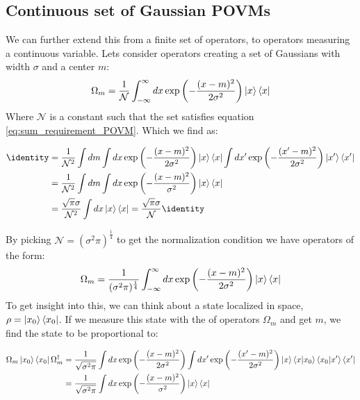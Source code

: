 \subsection{Continuous set of Gaussian POVMs}
We can further extend this from a finite set of operators, to operators measuring a continuous variable. Lets consider operators creating a set of Gaussians with width $\sigma$ and a center $m$:
\begin{equation}
    \Omega_m = \frac{1}{\mathcal{N}}\int_{-\infty}^\infty dx \exp\left(-\frac{(x- m)^2}{2\sigma^2}\right)\ket{x}\bra{x}
\end{equation}
Where $\mathcal{N}$ is a constant such that the set satisfies equation \ref{eq:sum_requirement_POVM}. Which we find as:
\begin{fullwidth}
\begin{align*}
    \identity &= \frac{1}{\mathcal{N}^2}\int dm \int dx \exp\left(-\frac{(x- m)^2}{2\sigma^2}\right)\ket{x}\bra{x}\int dx' \exp\left(-\frac{(x'- m)^2}{2\sigma^2}\right)\ket{x'}\bra{x'} \\
              &= \frac{1}{\mathcal{N}^2}\int dm \int dx \exp\left(-\frac{(x- m)^2}{\sigma^2}\right)\ket{x}\bra{x} \\
              &= \frac{\sqrt{\pi}\sigma }{\mathcal{N}^2} \int dx \ket{x}\bra{x} = \frac{\sqrt{\pi}\sigma }{\mathcal{N}} \identity 
\end{align*}
\end{fullwidth}
By picking $\mathcal{N}=(\sigma^2 \pi)^\frac14$ to get the normalization condition we have operators of the form:
\begin{equation}
    \Omega_m = \frac{1}{(\sigma^2 \pi)^\frac14}\int_{-\infty}^\infty dx \exp\left(-\frac{(x- m)^2}{2\sigma^2}\right)\ket{x}\bra{x}
\end{equation}
To get insight into this, we can think about a state localized in space, $\rho = \ket{x_0}\bra{x_0}$. If we measure this state with the of operators $\Omega_m$ and get $m$, we find the state to be proportional to: 
\begin{fullwidth}
\begin{align*}
    \Omega_m \ket{x_0}\bra{x_0}  \Omega_m^\dagger &= \frac{1}{\sqrt{\sigma^2\pi}}\int dx \exp\left(-\frac{(x- m)^2}{2\sigma^2}\right)\int dx' \exp\left(-\frac{(x'- m)^2}{2\sigma^2}\right)\ket{x}\bra{x}\ket{x_0}\bra{x_0}\ket{x'}\bra{x'} \\
    &= \frac{1}{\sqrt{\sigma^2\pi}}\int dx \exp\left(-\frac{(x- m)^2}{\sigma^2}\right)\ket{x}\bra{x}
\end{align*}
\end{fullwidth}
